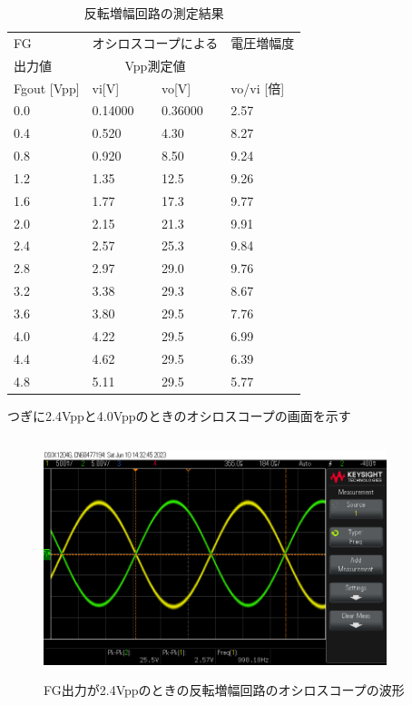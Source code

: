 \documentclass[a4j,10pt,dvipdfmx]{jarticle}
\begin{document}
\begin{table}[H]
  \begin{center}
  \begin{tabular}{|l|l|l|l|}
  \hline
      FG & \multicolumn{2}{|c|}{オシロスコープによる}  & 電圧増幅度 \\
      出力値 & \multicolumn{2}{|c|}{Vpp測定値}  & \\ \hline
      Fgout [Vpp] & vi[V] & vo[V] & vo/vi [倍] \\ \hline
      0.0  & 0.14000 & 0.36000 & 2.57 \\ \hline
      0.4  & 0.520  & 4.30  & 8.27 \\ \hline
      0.8  & 0.920  & 8.50  & 9.24 \\ \hline
      1.2  & 1.35  & 12.5  & 9.26 \\ \hline
      1.6  & 1.77  & 17.3  & 9.77 \\ \hline
      2.0  & 2.15  & 21.3  & 9.91 \\ \hline
      2.4  & 2.57  & 25.3  & 9.84 \\ \hline
      2.8  & 2.97  & 29.0  & 9.76 \\ \hline
      3.2  & 3.38  & 29.3  & 8.67 \\ \hline
      3.6  & 3.80  & 29.5  & 7.76 \\ \hline
      4.0  & 4.22  & 29.5  & 6.99 \\ \hline
      4.4  & 4.62  & 29.5  & 6.39 \\ \hline
      4.8  & 5.11  & 29.5  & 5.77 \\ \hline
  \end{tabular}
  \caption{反転増幅回路の測定結果}
\end{center}
\end{table}
つぎに2.4Vppと4.0Vppのときのオシロスコープの画面を示す
\begin{figure}[H]
  \begin{center}
  \includegraphics[height=7cm,width=10cm]{2.4Vpp.png}
  \caption{FG出力が2.4Vppのときの反転増幅回路のオシロスコープの波形}
\end{center}
\end{figure}
\end{document}
